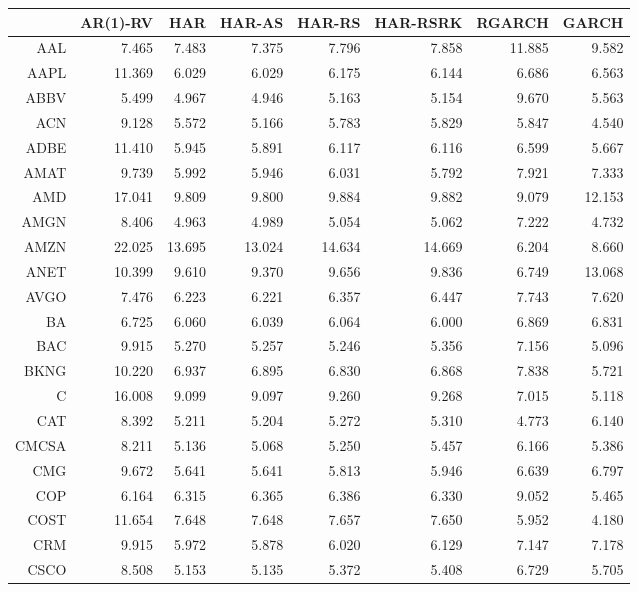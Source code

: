 \begin{table}[ht]
\centering
\begin{tabular}{rrrrrrrr}
  \hline
 & AR(1)-RV & HAR & HAR-AS & HAR-RS & HAR-RSRK & RGARCH & GARCH \\ 
  \hline
AAL & 7.465 & 7.483 & 7.375 & 7.796 & 7.858 & 11.885 & 9.582 \\ 
  AAPL & 11.369 & 6.029 & 6.029 & 6.175 & 6.144 & 6.686 & 6.563 \\ 
  ABBV & 5.499 & 4.967 & 4.946 & 5.163 & 5.154 & 9.670 & 5.563 \\ 
  ACN & 9.128 & 5.572 & 5.166 & 5.783 & 5.829 & 5.847 & 4.540 \\ 
  ADBE & 11.410 & 5.945 & 5.891 & 6.117 & 6.116 & 6.599 & 5.667 \\ 
  AMAT & 9.739 & 5.992 & 5.946 & 6.031 & 5.792 & 7.921 & 7.333 \\ 
  AMD & 17.041 & 9.809 & 9.800 & 9.884 & 9.882 & 9.079 & 12.153 \\ 
  AMGN & 8.406 & 4.963 & 4.989 & 5.054 & 5.062 & 7.222 & 4.732 \\ 
  AMZN & 22.025 & 13.695 & 13.024 & 14.634 & 14.669 & 6.204 & 8.660 \\ 
  ANET & 10.399 & 9.610 & 9.370 & 9.656 & 9.836 & 6.749 & 13.068 \\ 
  AVGO & 7.476 & 6.223 & 6.221 & 6.357 & 6.447 & 7.743 & 7.620 \\ 
  BA & 6.725 & 6.060 & 6.039 & 6.064 & 6.000 & 6.869 & 6.831 \\ 
  BAC & 9.915 & 5.270 & 5.257 & 5.246 & 5.356 & 7.156 & 5.096 \\ 
  BKNG & 10.220 & 6.937 & 6.895 & 6.830 & 6.868 & 7.838 & 5.721 \\ 
  C & 16.008 & 9.099 & 9.097 & 9.260 & 9.268 & 7.015 & 5.118 \\ 
  CAT & 8.392 & 5.211 & 5.204 & 5.272 & 5.310 & 4.773 & 6.140 \\ 
  CMCSA & 8.211 & 5.136 & 5.068 & 5.250 & 5.457 & 6.166 & 5.386 \\ 
  CMG & 9.672 & 5.641 & 5.641 & 5.813 & 5.946 & 6.639 & 6.797 \\ 
  COP & 6.164 & 6.315 & 6.365 & 6.386 & 6.330 & 9.052 & 5.465 \\ 
  COST & 11.654 & 7.648 & 7.648 & 7.657 & 7.650 & 5.952 & 4.180 \\ 
  CRM & 9.915 & 5.972 & 5.878 & 6.020 & 6.129 & 7.147 & 7.178 \\ 
  CSCO & 8.508 & 5.153 & 5.135 & 5.372 & 5.408 & 6.729 & 5.705 \\ 

\end{tabular}
\end{table}
